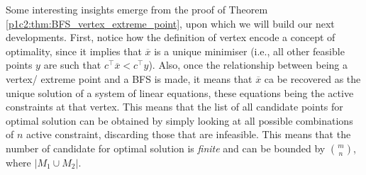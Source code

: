 Some interesting insights emerge from the proof of Theorem \ref{p1c2:thm:BFS_vertex_extreme_point}, upon which we will build our next developments. First, notice how the definition of vertex encode a concept of optimality, since it implies that $\overline{x}$ is a unique minimiser (i.e., all other feasible points $y$ are such that $c^\top\overline{x} < c^\top y$). Also, once the relationship between being a vertex/ extreme point and a BFS is made, it means that $\overline{x}$ ca be recovered as the unique solution of a system of linear equations, these equations being the active constraints at that vertex. This means that the list of all candidate points for optimal solution can be obtained by simply looking at all possible combinations of $n$ active constraint, discarding those that are infeasible. This means that the number of candidate for optimal solution is \emph{finite} and can be bounded by $\binom{m}{n}$, where $| M_1 \cup M_2 |$. 


 

